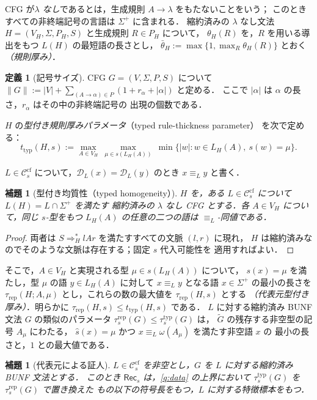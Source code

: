 \documentclass[11pt,a4paper]{ltjsarticle}
\numberwithin{equation}{section}
\theoremstyle{plain}
\newtheorem{lemma}[theorem]{補題}
\theoremstyle{definition}
\newtheorem{definition}[theorem]{定義}
\theoremstyle{remark}
\theoremstyle{plain}
\newcommand{\cf}{\mathrm{cf}}
\newcommand{\Ccf}[1]{\mathcal C_{#1}^{\cf}}
\newcommand{\Rec}{\mathsf{Rec}}
\newcommand{\D}{\mathcal{D}}
\newcommand{\ttyp}{t_{\mathrm{typ}}}
\newcommand{\trep}{\tau_{\mathrm{rep}}}
\begin{document}
CFG が\emph{$\lambda$ なし}であるとは，生成規則 $A\to\lambda$ をもたないことをいう；
このときすべての非終端記号の言語は $\Sigma^+$ に含まれる．
縮約済みの $\lambda$ なし文法 $H=(V_H,\Sigma,P_H,S)$ と生成規則 $R\in P_H$ について，
$\theta_H(R)$ を，$R$ を用いる導出をもつ $L(H)$ の最短語の長さとし，
$\bar\theta_H:=\max\{1,\max_{R}\theta_H(R)\}$ とおく
\emph{（規則厚み）}．
\begin{definition}[記号サイズ]
\label{def:symbol-size}
CFG $G=(V,\Sigma,P,S)$ について
$\|G\|:=|V|+\sum_{(A\to\alpha)\in P}(1+r_\alpha+|\alpha|)$ と定める．
ここで $|\alpha|$ は $\alpha$ の長さ，$r_\alpha$ はその中の非終端記号の
出現の個数である．
\end{definition}

$H$ の\emph{型付き規則厚みパラメータ}（typed rule-thickness parameter）
を次で定める：
\[
 \ttyp(H,s):=\max_{A\in V_H}\ \max_{\mu\in s(L_H(A))}\
 \min\{|w|:w\in L_H(A),\ s(w)=\mu\}.
\]

$L\in\Ccf{s}$ について，$\D_L(x)=\D_L(y)$ のとき $x\equiv_L y$ と書く．

\begin{lemma}[型付き均質性（typed homogeneity）]
\label{lem:homogeneity}
$H$ を，ある $L\in\Ccf{s}$ について $L(H)=L\cap\Sigma^+$ を満たす
縮約済みの $\lambda$ なし CFG とする．各 $A\in V_H$ について，同じ $s$-型をもつ
$L_H(A)$ の任意の二つの語は $\equiv_L$-同値である．
\end{lemma}

\begin{proof}
両者は $S\Rightarrow_H^*lAr$ を満たすすべての文脈 $(l,r)$ に現れ，
$H$ は縮約済みなのでそのような文脈は存在する；固定 $s$ 代入可能性を
適用すればよい．
\end{proof}

そこで，$A\in V_H$ と実現される型 $\mu\in s(L_H(A))$ について，
$s(x)=\mu$ を満たし，型 $\mu$ の語 $y\in L_H(A)$ に対して
$x\equiv_L y$ となる語 $x\in\Sigma^+$ の最小の長さを
$\trep(H;A,\mu)$ とし，これらの数の最大値を $\trep(H,s)$ とする
\emph{（代表元型付き厚み）}．明らかに $\trep(H,s)\le\ttyp(H,s)$ である．
$L$ に対する縮約済み BUNF 文法 $G$ の類似のパラメータ
$\tau^{\mathrm{rep}}_s(G)\le\tau^{\mathrm{typ}}_s(G)$ は，
$\widetilde G$ の残存する非空型の記号 $A_\mu$ にわたる，
$\widehat s(x)=\mu$ かつ $x\equiv_L\omega(A_\mu)$ を満たす非空語 $x$ の
最小の長さと，$1$ との最大値である．

\begin{lemma}[代表元による証人]
\label{lem:rep-witness}
$L\in\Ccf{s}$ を非空とし，$G$ を $L$ に対する縮約済み BUNF 文法とする．
このとき $\Rec_s$ は，\ref{q:data} の上界において
$\tau^{\mathrm{typ}}_s(G)$ を $\tau^{\mathrm{rep}}_s(G)$ で置き換えた
もの以下の符号長をもつ，$L$ に対する特徴標本をもつ．
\end{lemma}
\end{document}
